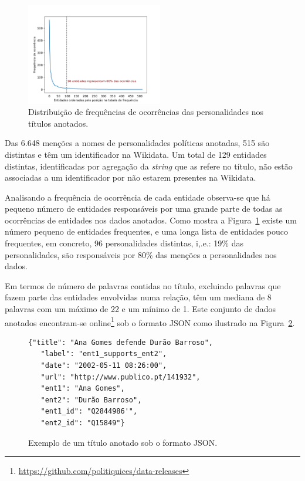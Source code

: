 \documentclass[a4paper, twocolumn, 11pt, twoside]{article}
\begin{document}


\begin{figure}
  \centering
    \includegraphics[width=0.53\textwidth]{power_law_ent_freq.png}
  \caption{Distribuição de frequências de ocorrências das personalidades nos títulos anotados.}
  \label{fig:ent_power_law}
\end{figure}

Das 6.648 menções a nomes de personalidades políticas anotadas, 515 são distintas e têm um identificador na Wikidata. Um total de 129 entidades distintas, identificadas por agregação da \textit{string} que as refere no título, não estão associadas a um identificador por não estarem presentes na Wikidata. 

Analisando a frequência de ocorrência de cada entidade observa-se que há pequeno número de entidades responsáveis por uma grande parte de todas as ocorrências de entidades nos dados anotados. Como mostra a Figura~\ref{fig:ent_power_law} existe um número pequeno de entidades frequentes, e uma longa lista de entidades pouco frequentes, em concreto, 96 personalidades distintas, i,.e.: 19\% das personalidades, são responsáveis por 80\% das menções a personalidades nos dados.

Em termos de número de palavras contidas no título, excluindo palavras que fazem parte das entidades envolvidas numa relação, têm um mediana de 8 palavras com um máximo de 22 e um mínimo de 1. Este conjunto de dados anotados encontram-se online\footnote{\url{https://github.com/politiquices/data-releases}} sob o formato JSON como ilustrado na Figura~\ref{fig:json_sample}.

\begin{figure}[!h]
\begin{Verbatim}[fontsize=\small]
  {"title": "Ana Gomes defende Durão Barroso",
   "label": "ent1_supports_ent2",
   "date": "2002-05-11 08:26:00",
   "url": "http://www.publico.pt/141932",
   "ent1": "Ana Gomes",
   "ent2": "Durão Barroso",
   "ent1_id": "Q2844986'",
   "ent2_id": "Q15849"}
\end{Verbatim}
  \caption{Exemplo de um título anotado sob o formato JSON.}
  \label{fig:json_sample}
\end{figure}
\end{document}
